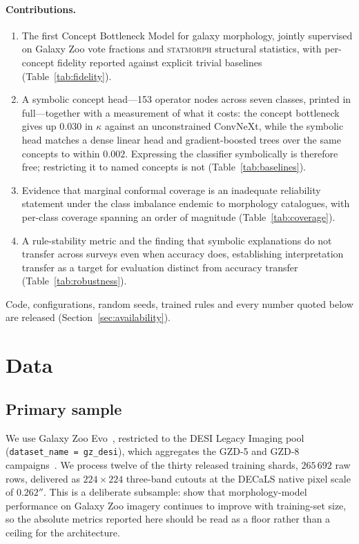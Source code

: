 \documentclass[11pt]{article}
\newcommand{\code}[1]{\texttt{\small #1}}
\begin{document}
\paragraph{Contributions.}
\begin{enumerate}
\item The first Concept Bottleneck Model for galaxy morphology, jointly
supervised on Galaxy Zoo vote fractions and \textsc{statmorph} structural
statistics, with per-concept fidelity reported against explicit trivial
baselines (Table~\ref{tab:fidelity}).
\item A symbolic concept head---153 operator nodes across seven classes,
printed in full---together with a measurement of what it costs: the concept
bottleneck gives up $0.030$ in $\kappa$ against an unconstrained ConvNeXt,
while the symbolic head matches a dense linear head and gradient-boosted trees
over the same concepts to within $0.002$. Expressing the classifier
symbolically is therefore free; restricting it to named concepts is not
(Table~\ref{tab:baselines}).
\item Evidence that marginal conformal coverage is an inadequate reliability
statement under the class imbalance endemic to morphology catalogues, with
per-class coverage spanning an order of magnitude (Table~\ref{tab:coverage}).
\item A rule-stability metric and the finding that symbolic explanations do
not transfer across surveys even when accuracy does, establishing
interpretation transfer as a target for evaluation distinct from accuracy
transfer (Table~\ref{tab:robustness}).
\end{enumerate}

Code, configurations, random seeds, trained rules and every number quoted
below are released (Section~\ref{sec:availability}).

\section{Data}
\label{sec:data}

\subsection{Primary sample}

We use Galaxy Zoo Evo~\citep{walmsley2025gzevo}, restricted to the DESI Legacy
Imaging pool (\code{dataset\_name = gz\_desi}), which aggregates the GZD-5 and
GZD-8 campaigns~\citep{walmsley2022,walmsley2023desi}. We process twelve of
the thirty released training shards, $265\,692$ raw rows, delivered as
$224\times224$ three-band cutouts at the DECaLS native pixel scale of
$0.262''$. This is a deliberate subsample: \citet{walmsley2024scaling} show
that morphology-model performance on Galaxy Zoo imagery continues to improve
with training-set size, so the absolute metrics reported here should be read
as a floor rather than a ceiling for the architecture.
\end{document}
